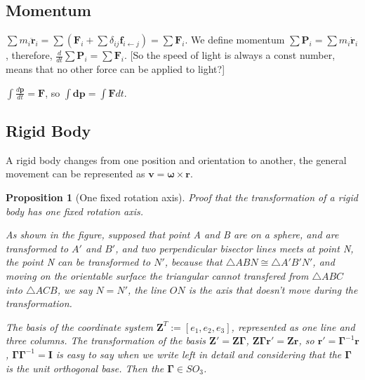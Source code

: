 \documentclass[UTF8]{book}
\newtheorem{proposition}{\hspace{2em}Proposition}[chapter] %
\begin{document}
\subsection{Momentum}

$\sum m_i \boldsymbol {\ddot{r}}_i= \sum ({\boldsymbol F}_i + \sum \delta_{ij}\boldsymbol{f}_{i \leftarrow j})  = \sum \boldsymbol F_i $. We define momentum $\sum \boldsymbol{P}_i  =  \sum m_i \boldsymbol {\dot{r}}_i$, therefore, $\frac{d}{dt} \sum \boldsymbol{P}_i  = \sum {\boldsymbol F}_i$. [So the speed of light is always a const number, means that no other force can be applied to light?]

$\int \frac{d \boldsymbol{p}}{dt} = \boldsymbol{F}$, so $\int \boldsymbol{dp} = \int \boldsymbol F dt$.

\subsection{Rigid Body}
A rigid body changes from one position and orientation to another, the general movement can be represented as $\boldsymbol{v} = \boldsymbol \omega  \times \boldsymbol{r} $. 



\begin{proposition}[One fixed rotation axis]

Proof that the transformation of a rigid body has one fixed rotation axis. 

As shown in the figure, supposed that point A and B are on a sphere, and are transformed to $A'$ and $B'$, and two perpendicular bisector lines meets at point N, the point N can be transformed to $N'$, because that $\bigtriangleup ABN \cong  \bigtriangleup A'B'N'$, and moving on the orientable surface the triangular cannot transfered from $\bigtriangleup ABC$ into $\bigtriangleup ACB$, we say $N = N'$, the line $ON$ is the axis that doesn't move during the transformation.
    
The basis of the coordinate system $\boldsymbol{Z}^T := [e_1,e_2,e_3]$, represented as one line and three columns. The transformation of the basis $\boldsymbol{Z}' = \boldsymbol Z \boldsymbol{\Gamma }$, $\boldsymbol Z \boldsymbol{\Gamma } \boldsymbol{r}' =\boldsymbol Z \boldsymbol r $, so $ \boldsymbol{r}' = \boldsymbol{\Gamma } ^{-1}\boldsymbol{r}$, $\boldsymbol{\Gamma } \boldsymbol{\Gamma } ^{-1} = \boldsymbol{I}$ is easy to say when we write left in detail and considering that the $\boldsymbol{\Gamma }$ is the unit orthogonal base. Then the $\boldsymbol{\Gamma } \in SO_3$.
\end{proposition}
\end{document}
